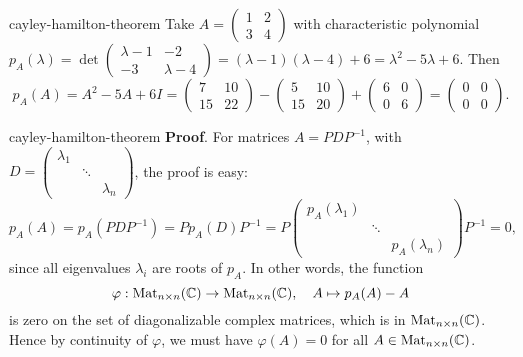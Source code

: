 \begin{example}{cayley-hamilton-theorem}
    Take $A = \begin{pmatrix} 1 & 2 \\ 3 & 4 \end{pmatrix}$ with characteristic polynomial $p_A(\lambda) = \det \begin{pmatrix} \lambda - 1 & -2 \\ -3 & \lambda - 4 \end{pmatrix} = (\lambda - 1)(\lambda - 4)  + 6 = \lambda^2 - 5 \lambda + 6$. Then
    \[ p_A(A) = A^2 - 5A + 6I = \begin{pmatrix} 7 & 10 \\ 15 & 22 \end{pmatrix} - \begin{pmatrix} 5 & 10 \\ 15 & 20 \end{pmatrix} + \begin{pmatrix} 6 & 0 \\ 0 & 6 \end{pmatrix} = \begin{pmatrix} 0 & 0 \\ 0 & 0 \end{pmatrix} . \]
\end{example}

\begin{example}{cayley-hamilton-theorem}
    \textbf{Proof}. For  matrices $A = PDP^{-1}$, with $D = \begin{pmatrix} \lambda_1 && \\ & \ddots & \\ && \lambda_n \end{pmatrix}$, the proof is easy:
    \[ p_A(A) = p_A(PDP^{-1}) = P p_A(D) P^{-1} = P \begin{pmatrix} p_A(\lambda_1) & & \\ & \ddots & \\ & & p_A(\lambda_n) \end{pmatrix} P^{-1} = 0 , \]
    since all eigenvalues $\lambda_i$ are roots of $p_A$. In other words, the function
    \[ \varphi : \textup{Mat}_{n \times n}(\mathbb{C}) \to \textup{Mat}_{n \times n}(\mathbb{C}), \quad A \mapsto p_A(A) - A \]
    is zero on the set of diagonalizable complex matrices, which is  in $\textup{Mat}_{n \times n}(\mathbb{C})$. Hence by continuity of $\varphi$, we must have $\varphi(A) = 0$ for all $A \in \textup{Mat}_{n \times n}(\mathbb{C})$.
\end{example}


